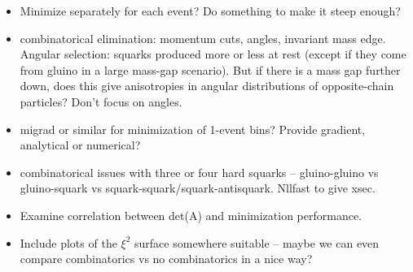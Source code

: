 \documentclass[twoside,english]{uiofysmaster}
\begin{document}
\begin{itemize}
	\item Minimize separately for each event? Do something to make it steep enough?
	\item combinatorical elimination: momentum cuts, angles, invariant mass edge. Angular selection: squarks produced more or less at rest (except if they come from gluino in a large mass-gap scenario). But if there is a mass gap further down, does this give anisotropies in angular distributions of opposite-chain particles? Don't focus on angles.
	\item migrad or similar for minimization of 1-event bins? Provide gradient, analytical or numerical?
	\item combinatorical issues with three or four hard squarks -- gluino-gluino vs gluino-squark vs squark-squark/squark-antisquark. Nllfast to give xsec. 
	\item Examine correlation between det(A) and minimization performance. 
	\item Include plots of the $\xi^2$ surface somewhere suitable -- maybe we can even compare combinatorics vs no combinatorics in a nice way?
\end{itemize}















































\end{document}
